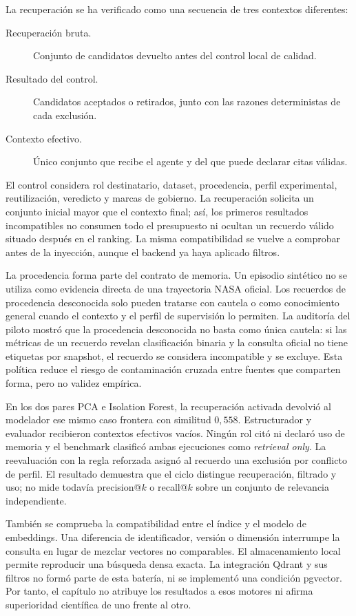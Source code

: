 La recuperación se ha verificado como una secuencia de tres contextos
diferentes:

\begin{description}
  \item[Recuperación bruta.] Conjunto de candidatos devuelto antes del control
        local de calidad.
  \item[Resultado del control.] Candidatos aceptados o retirados, junto con las
        razones deterministas de cada exclusión.
  \item[Contexto efectivo.] Único conjunto que recibe el agente y del que puede
        declarar citas válidas.
\end{description}

El control considera rol destinatario, dataset, procedencia, perfil
experimental, reutilización, veredicto y marcas de gobierno. La recuperación
solicita un conjunto inicial mayor que el contexto final; así, los primeros
resultados incompatibles no consumen todo el presupuesto ni ocultan un recuerdo
válido situado después en el ranking. La misma compatibilidad se vuelve a
comprobar antes de la inyección, aunque el backend ya haya aplicado filtros.

La procedencia forma parte del contrato de memoria. Un episodio sintético no se
utiliza como evidencia directa de una trayectoria NASA oficial. Los recuerdos
de procedencia desconocida solo pueden tratarse con cautela o como conocimiento
general cuando el contexto y el perfil de supervisión lo permiten. La auditoría
del piloto mostró que la procedencia desconocida no basta como única cautela:
si las métricas de un recuerdo revelan clasificación binaria y la consulta
oficial no tiene etiquetas por snapshot, el recuerdo se considera incompatible
y se excluye. Esta política reduce el riesgo de contaminación cruzada entre
fuentes que comparten forma, pero no validez empírica.

En los dos pares PCA e Isolation Forest, la recuperación activada devolvió al
modelador ese mismo caso frontera con similitud $0{,}558$. Estructurador y
evaluador recibieron contextos efectivos vacíos. Ningún rol citó ni declaró uso
de memoria y el benchmark clasificó ambas ejecuciones como \emph{retrieval
only}. La reevaluación con la regla reforzada asignó al recuerdo una exclusión
por conflicto de perfil. El resultado demuestra que el ciclo distingue
recuperación, filtrado y uso; no mide todavía precision@$k$ o recall@$k$ sobre
un conjunto de relevancia independiente.

También se comprueba la compatibilidad entre el índice y el modelo de
embeddings. Una diferencia de identificador, versión o dimensión interrumpe la
consulta en lugar de mezclar vectores no comparables. El almacenamiento local
permite reproducir una búsqueda densa exacta. La integración Qdrant y sus
filtros no formó parte de esta batería, ni se implementó una condición
pgvector. Por tanto, el capítulo no atribuye los resultados a esos motores ni
afirma superioridad científica de uno frente al otro.

